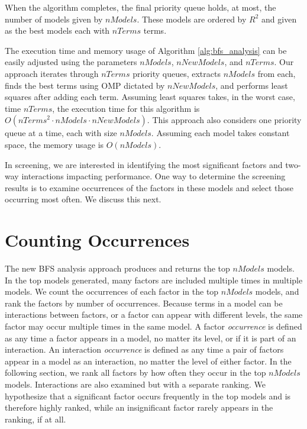 When the algorithm completes, the final priority queue holds, at most, the number of models given by $nModels$. 
These models are ordered by $R^2$ and given as the best models each with $nTerms$ terms.

The execution time and memory usage of Algorithm \ref{alg:bfs_analysis} can be easily adjusted using the parameters $nModels$, $nNewModels$, and $nTerms$.
Our approach iterates through $nTerms$ priority queues, extracts $nModels$ from each, finds the best terms using OMP dictated by $nNewModels$, and performs least squares after adding each term. 
Assuming least squares takes, in the worst case, time $nTerms$, the execution time for this algorithm is $O( \mathit{nTerms}^{2} \cdot \mathit{nModels} \cdot \mathit{nNewModels} )$. 
This approach also considers one priority queue at a time, each with size $nModels$. 
Assuming each model takes constant space, the memory usage is $O(nModels)$. 

In screening, we are interested in identifying the most significant factors and two-way interactions impacting performance.
One way to determine the screening results is to examine occurrences of the factors in these models and select those occurring most often.
We discuss this next.

\section{Counting Occurrences} \label{sect:occurrences}

The new BFS analysis approach produces and returns the top $\mathit{nModels}$ models.
In the top models generated, many factors are included multiple times in multiple models.
We count the occurrences of each factor in the top $\mathit{nModels}$ models, and rank the factors by number of occurrences.
Because terms in a model can be interactions between factors, or a factor can appear with different levels, the same factor may occur multiple times in the same model. 
A factor {\em occurrence} is defined as any time a factor appears in a model, no matter its level, or if it is part of an interaction.
An interaction {\em occurrence} is defined as any time a pair of factors appear in a model as an interaction, no matter the level of either factor. 
In the following section, we rank all factors by how often they occur in the top $\mathit{nModels}$ models.
Interactions are also examined but with a separate ranking.
We hypothesize that a significant factor occurs frequently in the top models and is therefore highly ranked, while an insignificant factor rarely appears in the ranking, if at all.

